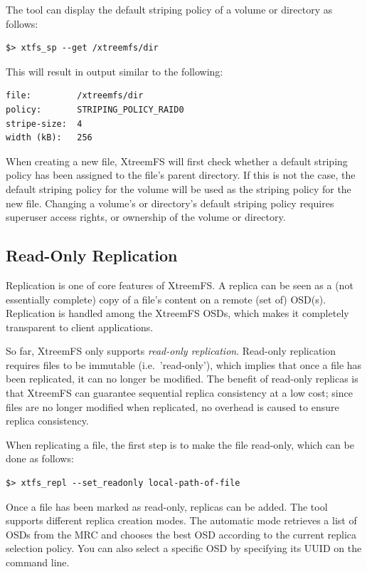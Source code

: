 \documentclass[a4paper,10pt]{book}
\begin{document}
The tool can display the default striping policy of a volume or directory as follows:

\begin{verbatim}
$> xtfs_sp --get /xtreemfs/dir
\end{verbatim}

This will result in output similar to the following:

\begin{verbatim}
file:         /xtreemfs/dir
policy:       STRIPING_POLICY_RAID0
stripe-size:  4
width (kB):   256
\end{verbatim}

When creating a new file, XtreemFS will first check whether a default striping policy has been assigned to the file's parent directory. If this is not the case, the default striping policy for the volume will be used as the striping policy for the new file. Changing a volume's or directory's default striping policy requires superuser access rights, or ownership of the volume or directory.


\subsection{Read-Only Replication}
\label{sec:roreplication}

Replication is one of core features of XtreemFS. A replica can be seen as a (not essentially complete) copy of a file's content on a remote (set of) OSD(s). Replication is handled among the XtreemFS OSDs, which makes it completely transparent to client applications.

So far, XtreemFS only supports \emph{read-only replication}. Read-only replication requires files to be immutable (i.e.\ 'read-only'), which implies that once a file has been replicated, it can no longer be modified. The benefit of read-only replicas is that XtreemFS can guarantee sequential replica consistency at a low cost; since files are no longer modified when replicated, no overhead is caused to ensure replica consistency.

When replicating a file, the first step is to make the file read-only, which can be done as follows:

\begin{verbatim}
$> xtfs_repl --set_readonly local-path-of-file
\end{verbatim}

Once a file has been marked as read-only, replicas can be added. The tool supports different replica creation modes. The automatic mode retrieves a list of OSDs from the MRC and chooses the best OSD according to the current replica selection policy. You can also select a specific OSD by specifying its UUID on the command line.
\end{document}
